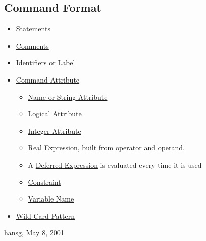 




\subsection{Command Format}
\begin{itemize}
	\item \href{statement.html}{Statements}
	\item \href{statement.html}{Comments}
	\item \href{label.html}{Identifiers or Label}
	\item \href{attribute.html}{Command Attribute}
\begin{itemize}
	\item \href{name.html}{Name or String Attribute}
	\item \href{logical.html}{Logical Attribute}
	\item \href{integer.html}{Integer Attribute}
	\item \href{expression.html}{Real Expression}, built from \href{expression.html#operator}{operator} and \href{expression.html#operand}{operand}. 
	\item A \href{expression.html#defer}{Deferred Expression} is evaluated every time it is used 
	\item \href{constraint.html}{Constraint}
	\item \href{variable.html}{Variable Name}
\end{itemize}
	\item \href{wildcard.html}{Wild Card Pattern}
\end{itemize}\href{http://www.cern.ch/Hans.Grote/hansg_sign.html}{hansg}, May 8, 2001 













